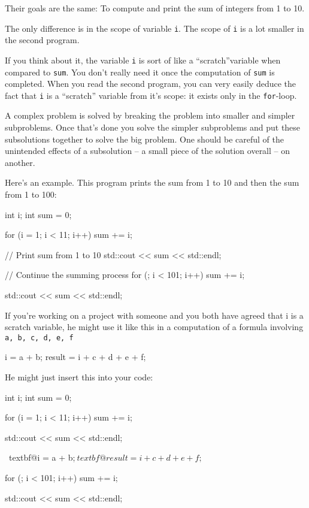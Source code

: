 Their goals are the same: To compute and print the sum of integers from
1 to 10.

The only difference is in the scope of variable \texttt{i}. The scope of
\texttt{i} is a lot smaller in the second program.

If you think about it, the variable \texttt{i} is sort of like a
``scratch''variable when compared to \texttt{sum}. You
don't really need it once the computation of \texttt{sum}
is completed. When you read the second program, you can very easily
deduce the fact that \texttt{i} is a ``scratch'' variable from
it's scope: it exists only in the \texttt{for}-loop.

A complex problem is solved by breaking the problem into smaller and
simpler subproblems. Once that's done you solve the
simpler subproblems and put these subsolutions together to solve the big
problem. One should be careful of the unintended effects of a
subsolution -- a small piece of the solution overall -- on another.

Here's an example. This program prints the sum from 1 to
10 and then the sum from 1 to 100:
\begin{console}
int i;
int sum = 0;

for (i = 1; i < 11; i++)
{   
    sum += i;
}

// Print sum from 1 to 10
std::cout << sum << std::endl;

// Continue the summing process
for (; i < 101; i++)
{   
    sum += i;
}

std::cout << sum << std::endl;
\end{console}
If you're working on a project with someone and you both
have agreed that i is a scratch variable, he might use it like this in a
computation of a formula involving \texttt{a, b, c, d, e, f}
\begin{console}
i = a + b;
result = i + c + d + e + f;
\end{console}
He might just insert this into your code:
\begin{console}[commandchars=\~\@\$]
int i;
int sum = 0;

for (i = 1; i < 11; i++)
{   
    sum += i;
}

std::cout << sum << std::endl;

~textbf@i = a + b;$
~textbf@result = i + c + d + e + f;$

for (; i < 101; i++)
{   
    sum += i;
}

std::cout << sum << std::endl;
\end{console}


